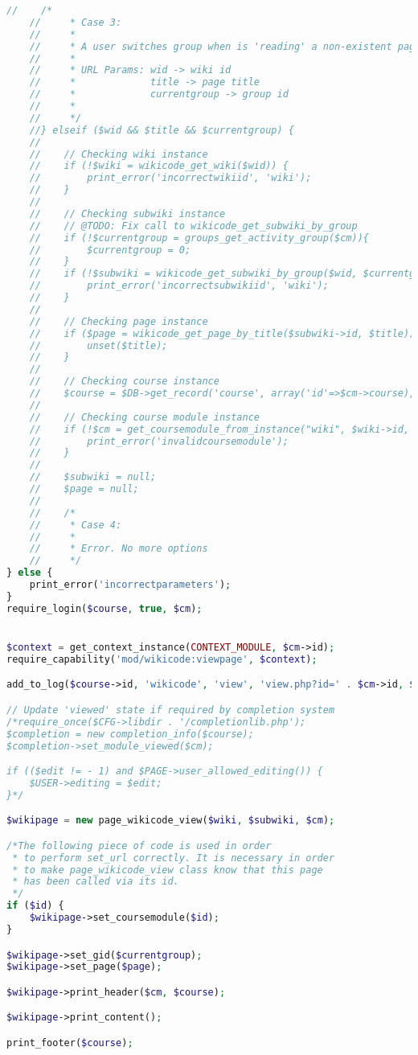 \begin{lstlisting}[language=PHP]
    //    /*
    //     * Case 3:
    //     *
    //     * A user switches group when is 'reading' a non-existent page.
    //     *
    //     * URL Params: wid -> wiki id
    //     *             title -> page title
    //     *             currentgroup -> group id
    //     *
    //     */
    //} elseif ($wid && $title && $currentgroup) {
    //
    //    // Checking wiki instance
    //    if (!$wiki = wikicode_get_wiki($wid)) {
    //        print_error('incorrectwikiid', 'wiki');
    //    }
    //
    //    // Checking subwiki instance
    //    // @TODO: Fix call to wikicode_get_subwiki_by_group
    //    if (!$currentgroup = groups_get_activity_group($cm)){
    //        $currentgroup = 0;
    //    }
    //    if (!$subwiki = wikicode_get_subwiki_by_group($wid, $currentgroup)) {
    //        print_error('incorrectsubwikiid', 'wiki');
    //    }
    //
    //    // Checking page instance
    //    if ($page = wikicode_get_page_by_title($subwiki->id, $title)) {
    //        unset($title);
    //    }
    //
    //    // Checking course instance
    //    $course = $DB->get_record('course', array('id'=>$cm->course), '*', MUST_EXIST);
    //
    //    // Checking course module instance
    //    if (!$cm = get_coursemodule_from_instance("wiki", $wiki->id, $course->id)) {
    //        print_error('invalidcoursemodule');
    //    }
    //
    //    $subwiki = null;
    //    $page = null;
    //
    //    /*
    //     * Case 4:
    //     *
    //     * Error. No more options
    //     */
} else {
    print_error('incorrectparameters');
}
require_login($course, true, $cm);


$context = get_context_instance(CONTEXT_MODULE, $cm->id);
require_capability('mod/wikicode:viewpage', $context);

add_to_log($course->id, 'wikicode', 'view', 'view.php?id=' . $cm->id, $wiki->id);

// Update 'viewed' state if required by completion system
/*require_once($CFG->libdir . '/completionlib.php');
$completion = new completion_info($course);
$completion->set_module_viewed($cm);

if (($edit != - 1) and $PAGE->user_allowed_editing()) {
    $USER->editing = $edit;
}*/

$wikipage = new page_wikicode_view($wiki, $subwiki, $cm);

/*The following piece of code is used in order
 * to perform set_url correctly. It is necessary in order
 * to make page_wikicode_view class know that this page
 * has been called via its id.
 */
if ($id) {
    $wikipage->set_coursemodule($id);
}

$wikipage->set_gid($currentgroup);
$wikipage->set_page($page);

$wikipage->print_header($cm, $course);

$wikipage->print_content();

print_footer($course);
\end{lstlisting}

